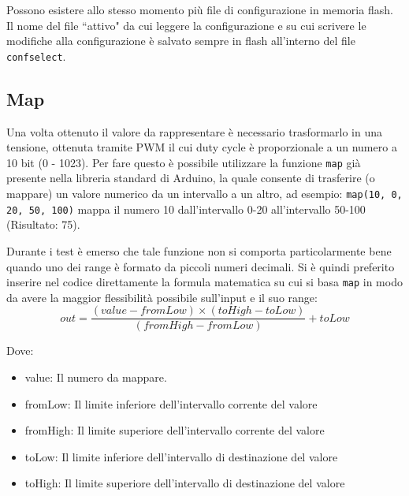 \documentclass[12pt,a4paper]{report}
\begin{document}
Possono esistere allo stesso momento più file di configurazione in memoria flash. Il nome del file ``attivo" da cui leggere
la configurazione e su cui scrivere le modifiche alla configurazione è salvato sempre in flash all'interno del file \texttt{confselect}.


\subsection{Map}
Una volta ottenuto il valore da rappresentare è necessario trasformarlo in una tensione, ottenuta tramite PWM il cui duty cycle è
proporzionale a un numero a 10 bit (0 - 1023). Per fare questo è possibile utilizzare la funzione \texttt{map} già presente nella
libreria standard di Arduino, la quale consente di trasferire (o mappare) un valore numerico da un intervallo a un altro, ad esempio:
\texttt{map(10, 0, 20, 50, 100)} mappa il numero 10 dall'intervallo 0-20 all'intervallo 50-100 (Risultato: 75).

Durante i test è emerso che tale funzione non si comporta particolarmente bene quando uno dei range è formato da piccoli numeri
decimali. Si è quindi preferito inserire nel codice direttamente la formula matematica su cui si basa \texttt{map} in modo da avere la
maggior flessibilità possibile sull'input e il suo range:
\[out = \frac{(value - fromLow) \times (toHigh - toLow)}{(fromHigh - fromLow)} + toLow \]

\noindent Dove:\cite{arduinomap}
\begin{itemize}
  \item value: Il numero da mappare.
  \item fromLow: Il limite inferiore dell'intervallo corrente del valore
  \item fromHigh: Il limite superiore dell'intervallo corrente del valore
  \item toLow: Il limite inferiore dell'intervallo di destinazione del valore
  \item toHigh: Il limite superiore dell'intervallo di destinazione del valore
\end{itemize}
\end{document}
